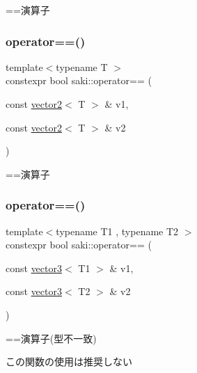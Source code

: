 ==演算子 

\mbox{\label{namespacesaki_a2aafc5056183a1a522b89497ee3439e9}} 
\subsubsection{\texorpdfstring{operator==()}{operator==()}\hspace{0.1cm}{\footnotesize\ttfamily [6/11]}}
{\footnotesize\ttfamily template$<$typename T $>$ \\
constexpr bool saki\+::operator== (\begin{DoxyParamCaption}\item[{const \mbox{\hyperlink{classsaki_1_1vector2}{vector2}}$<$ T $>$ \&}]{v1,  }\item[{const \mbox{\hyperlink{classsaki_1_1vector2}{vector2}}$<$ T $>$ \&}]{v2 }\end{DoxyParamCaption})}



==演算子 

\mbox{\label{namespacesaki_a5f3eb3ebd6a3ee43771849069101153f}} 
\subsubsection{\texorpdfstring{operator==()}{operator==()}\hspace{0.1cm}{\footnotesize\ttfamily [7/11]}}
{\footnotesize\ttfamily template$<$typename T1 , typename T2 $>$ \\
constexpr bool saki\+::operator== (\begin{DoxyParamCaption}\item[{const \mbox{\hyperlink{classsaki_1_1vector3}{vector3}}$<$ T1 $>$ \&}]{v1,  }\item[{const \mbox{\hyperlink{classsaki_1_1vector3}{vector3}}$<$ T2 $>$ \&}]{v2 }\end{DoxyParamCaption})}



==演算子(型不一致) 

この関数の使用は推奨しない \mbox{\label{namespacesaki_af2a10e5e2974f482b6da75d9137dc143}} 
